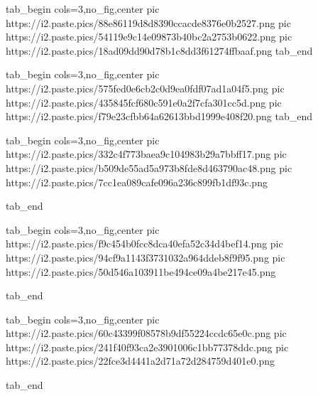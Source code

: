  
 
 
 
 
\zzSecCmtScr

\ifcmt
  tab_begin cols=3,no_fig,center
     pic https://i2.paste.pics/88e86119d8d8390ccacde8376e0b2527.png
     pic https://i2.paste.pics/54119e9c14e09873b40bc2a2753b0622.png
     pic https://i2.paste.pics/18ad09dd90d78b1c8dd3f61274ffbaaf.png
  tab_end
\fi

\ifcmt
  tab_begin cols=3,no_fig,center
     pic https://i2.paste.pics/575fed0e6cb2c0d9ea0fdf07ad1a04f5.png
     pic https://i2.paste.pics/435845fcf680c591e0a2f7cfa301cc5d.png
     pic https://i2.paste.pics/f79e23cfbb64a62613bbd1999e408f20.png
  tab_end
\fi

\ifcmt
  tab_begin cols=3,no_fig,center
	pic https://i2.paste.pics/332c4f773baea9c104983b29a7bbff17.png
	pic https://i2.paste.pics/b509de55ad5a973b8fde8d463790ac48.png
	pic https://i2.paste.pics/7cc1ea089cafe096a236c899fb1df93c.png

  tab_end
\fi


\ifcmt
  tab_begin cols=3,no_fig,center
     pic https://i2.paste.pics/f9c454b0fcc8dca40efa52c34d4bef14.png
		 pic https://i2.paste.pics/94cf9a1143f3731032a964ddeb8f9f95.png
		 pic https://i2.paste.pics/50d546a103911be494ce09a4be217e45.png

  tab_end
\fi

\ifcmt
  tab_begin cols=3,no_fig,center
	pic https://i2.paste.pics/60c43399f08578b9df55224ccdc65e0c.png
	pic https://i2.paste.pics/241f40f93ca2e3901006c1bb77378ddc.png
	pic https://i2.paste.pics/22fce3d4441a2d71a72d284759d401e0.png

  tab_end
\fi
